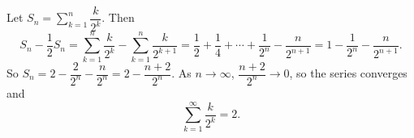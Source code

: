 Let $S_n=\displaystyle\sum_{k=1}^n\dfrac{k}{2^k}$. Then
\[
S_n-\dfrac{1}{2}S_n=\sum_{k=1}^n\dfrac{k}{2^k}-\sum_{k=1}^{n}\dfrac{k}{2^{k+1}}=\dfrac{1}{2}+\dfrac{1}{4}+\cdots+\dfrac{1}{2^n}-\dfrac{n}{2^{n+1}}=1-\dfrac{1}{2^n}-\dfrac{n}{2^{n+1}} .
\]
So $S_n=2-\dfrac{2}{2^n}-\dfrac{n}{2^n}=2-\dfrac{n+2}{2^n}$. As $n\to\infty$, $\dfrac{n+2}{2^n}\to0$, so the series converges and
\[
\sum_{k=1}^\infty\dfrac{k}{2^k}=\boxed{2}.
\]
